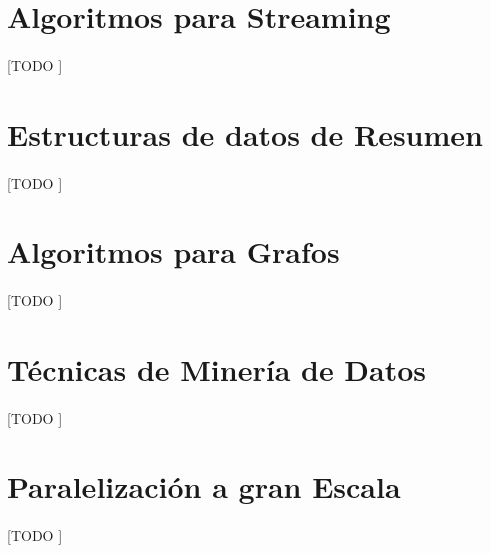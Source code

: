 \documentclass{article}
\begin{document}
  \maketitle %



  	\begin{abstract}
  		\noindent [TODO ]
  	\end{abstract}


  \section{Algoritmos para Streaming}

    \paragraph{}
    [TODO ]

  \section{Estructuras de datos de Resumen}

    \paragraph{}
    [TODO ]

  \section{Algoritmos para Grafos}

    \paragraph{}
    [TODO ]

  \section{Técnicas de Minería de Datos}

    \paragraph{}
    [TODO ]

  \section{Paralelización a gran Escala}

    \paragraph{}
    [TODO ]
\end{document}
